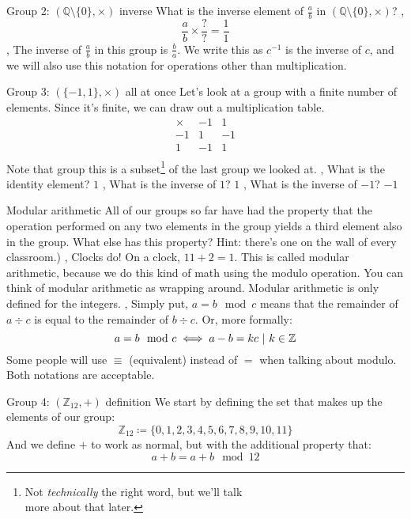 \begin{namedframe}{Group 2: $(\mathbb{Q} \setminus \{0\}, \times)$ inverse}
	What is the inverse element of $\frac{a}{b}$ in $(\mathbb{Q} \setminus \{0\}, \times)$?
	\sep
	\[\frac{a}{b} \times \frac{?}{?} = \frac{1}{1}\]
	\sep
	The inverse of $\frac{a}{b}$ in this group is $\frac{b}{a}$.
	\vertspace
	We write this as $c^{-1}$ is the inverse of $c$, and we will also use this notation for operations other than multiplication.
\end{namedframe}
\begin{namedframe}{Group 3: $(\{-1, 1\}, \times)$ all at once}
	Let's look at a group with a finite number of elements. Since it's finite, we can draw out a multiplication table.
	\begin{equation*}
		\begin{array}{r|rr}
			\times & -1 & 1 \\\hline
			-1     &  1 & -1\\
			1      & -1 & 1 \\
		\end{array}
	\end{equation*}
	Note that group this is a subset\footnote{Not \textit{technically} the right word, but we'll talk\\more about that later.} of the last group we looked at.
	\sep
	What is the identity element? \pause $1$
	\sep
	What is the inverse of $1$? \pause $1$
	\sep
	What is the inverse of $-1$? \pause $-1$
\end{namedframe}
\begin{namedframe}{Modular arithmetic}
	All of our groups so far have had the property that the operation performed on any two elements in the group yields a third element also in the group. What else has this property? \pause Hint: there's one on the wall of every classroom.)
	\sep
	Clocks do! On a clock, $11 + 2 = 1$. This is called modular arithmetic, because we do this kind of math using the modulo operation. You can think of modular arithmetic as wrapping around. Modular arithmetic is only defined for the integers.
	\sep
	Simply put, $a = b \mod c$ means that the remainder of $a \div c$ is equal to the remainder of $b \div c$. Or, more formally:
	\[a = b \mod c \iff a - b = kc \ |\  k \in \mathbb{Z}\]
	Some people will use $\equiv$ (equivalent) instead of $=$ when talking about modulo. Both notations are acceptable.
\end{namedframe}
\begin{namedframe}{Group 4: $(\mathbb{Z}_{12}, +)$ definition}
	We start by defining the set that makes up the elements of our group:
	\[\mathbb{Z}_{12} \coloneqq \{0, 1, 2, 3, 4, 5, 6, 7, 8, 9, 10, 11\}\]
	And we define $+$ to work as normal, but with the additional property that:
	\[a + b = a + b \mod 12\]
\end{namedframe}
